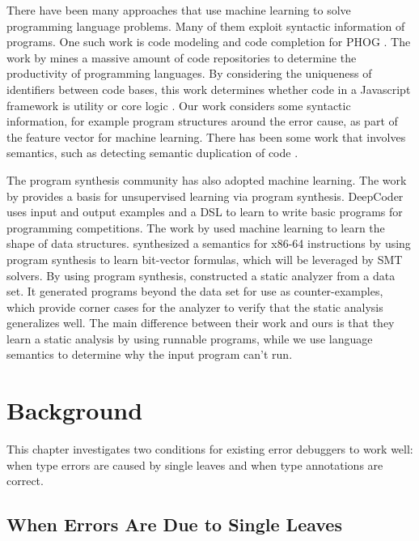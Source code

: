 \documentclass[12pt]{report}	%
\begin{document}
There have been many approaches that use machine learning to solve
programming language problems. Many of them exploit syntactic
information of programs. One such work is code modeling and code completion
for PHOG \cite{Bielik2016:PPM}.
The work by \cite{Allamanis:2013:MSC:2487085.2487127}
mines a massive amount of code
repositories to determine the productivity of programming languages.
By considering the
uniqueness of identifiers between code bases, this work
determines whether code in a Javascript framework is
utility or core logic \cite{Allamanis:2013:MSC:2487085.2487127}.
Our work considers some syntactic information, for example
program structures around the error cause, as part of the feature
vector for machine learning.
%
There has been
some work that involves semantics, such as detecting semantic
duplication of code \cite{Sheneamer:2016:SCD}.

The program synthesis community has also adopted machine learning.
The work by \cite{Ellis:2015:ULP:2969239.2969348} provides a basis for
unsupervised learning via program synthesis.
DeepCoder \cite{DBLP:journals/corr/BalogGBNT16} uses input and output
examples and a DSL to learn to write
basic programs for programming competitions.
The work by \cite{Zhu16:ALSS} used machine learning to learn
the shape of data structures. \cite{Heule:2016:SSA:2980983.2908121}
synthesized a semantics for x86-64 instructions by using program
synthesis to learn bit-vector formulas, which will be leveraged
by SMT solvers.
%
By using program synthesis, \cite{Bielik16:LSAD} constructed a static
analyzer from a data set.
It generated programs beyond the data set for use as counter-examples,
which provide corner cases for the analyzer to verify that the
static analysis generalizes well.
The main difference between their work
and ours is that they learn a static analysis by
using runnable programs, while we use language semantics
to determine why the input program can't run.



\chapter{Background}
\label{sec:background}

This chapter investigates two conditions for existing error debuggers to work well:
when type errors are caused by single leaves and when type annotations are correct.

\section{When Errors Are Due to Single Leaves}
\label{sec:background:leaves}
\end{document}

